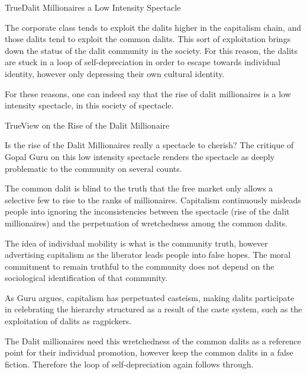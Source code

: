 \documentclass[11pt]{article}
\begin{document}
\begin{heading}{True}{}{Dalit Millionaires a Low Intensity Spectacle}
\begin{enumerate}[label=\bt{\theenumi.}]
		The corporate class tends to exploit the dalits higher in the capitalism chain, and those dalits tend to exploit the common dalits. This sort of exploitation brings down the status of the dalit community in the society. For this reason, the dalits are stuck in a loop of self-depreciation in order to escape towards individual identity, however only depressing their own cultural identity.

	\end{enumerate}

	For these reasons, one can indeed say that the rise of dalit millionaires is a low intensity spectacle, in this society of spectacle.

\end{heading}

\begin{heading}{True}{}{View on the Rise of the Dalit Millionaire}

	Is the rise of the Dalit Millionaires really a spectacle to cherish? The critique of Gopal Guru on this low intensity spectacle renders the spectacle as deeply problematic to the community on several counts.

	\begin{enumerate}[label=\bt{\theenumi.}]

		\ditem[Morality]

			The common dalit is blind to the truth that the free market only allows a selective few to rise to the ranks of millionaires. Capitalism continuously misleads people into ignoring the inconsistencies between the spectacle (rise of the dalit millionaires) and the perpetuation of wretchedness among the common dalits.

			The idea of individual mobility is what is the community truth, however advertising capitalism as the liberator leads people into false hopes. The moral commitment to remain truthful to the community does not depend on the sociological identification of that community.


			As Guru argues, capitalism has perpetuated casteism, making dalits participate in celebrating the hierarchy structured as a result of the caste system, such as the exploitation of dalits as ragpickers.

			The Dalit millionaires need this wretchedness of the common dalits as a reference point for their individual promotion, however keep the common dalits in a false fiction. Therefore the loop of self-depreciation again follows through.


\end{enumerate}
\end{heading}
\end{document}
